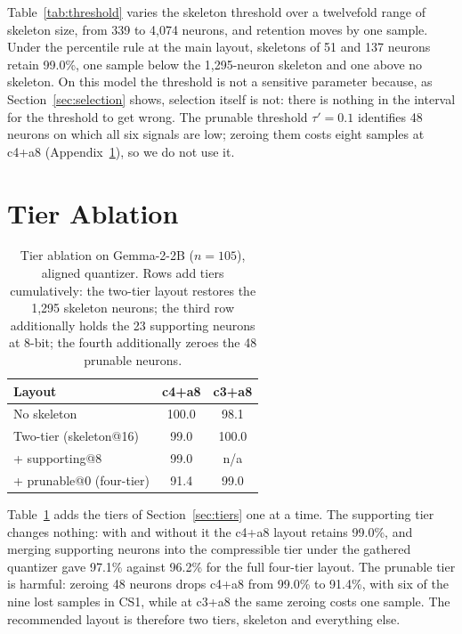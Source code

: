 \documentclass[11pt]{article}
\begin{document}
Table~\ref{tab:threshold} varies the skeleton threshold over 
a twelvefold range of skeleton size, from 339 to 4,074 
neurons, and retention moves by one sample. Under the 
percentile rule at the main layout, skeletons of 51 and 137 
neurons retain 99.0\%, one sample below the 1,295-neuron 
skeleton and one above no skeleton. On this model the threshold 
is not a sensitive parameter because, as 
Section~\ref{sec:selection} shows, selection itself is not: 
there is nothing in the interval for the threshold to get 
wrong. The prunable threshold $\tau'{=}0.1$ identifies 48 
neurons on which all six signals are low; zeroing them costs 
eight samples at c4+a8 (Appendix~\ref{app:tiers}), so we do not 
use it.

\section{Tier Ablation}
\label{app:tiers}

\begin{table}[t]
\centering
\small
\begin{tabular}{lcc}
\toprule
\textbf{Layout} & \textbf{c4+a8} & \textbf{c3+a8} \\
\midrule
No skeleton & 100.0 & 98.1 \\
Two-tier (skeleton@16) & 99.0 & 100.0 \\
+ supporting@8 & 99.0 & n/a \\
+ prunable@0 (four-tier) & 91.4 & 99.0 \\
\bottomrule
\end{tabular}
\caption{Tier ablation on Gemma-2-2B ($n{=}105$), aligned 
quantizer. Rows add tiers cumulatively: the two-tier layout 
restores the 1,295 skeleton neurons; the third row additionally 
holds the 23 supporting neurons at 8-bit; the fourth 
additionally zeroes the 48 prunable neurons.}
\label{tab:tier_ablation}
\end{table}

Table~\ref{tab:tier_ablation} adds the tiers of 
Section~\ref{sec:tiers} one at a time. The supporting tier 
changes nothing: with and without it the c4+a8 layout retains 
99.0\%, and merging supporting neurons into the compressible 
tier under the gathered quantizer gave 97.1\% against 96.2\% 
for the full four-tier layout. The prunable tier is harmful: 
zeroing 48 neurons drops c4+a8 from 99.0\% to 91.4\%, with six 
of the nine lost samples in CS1, while at c3+a8 the same 
zeroing costs one sample. The recommended layout is therefore 
two tiers, skeleton and everything else.
\end{document}
